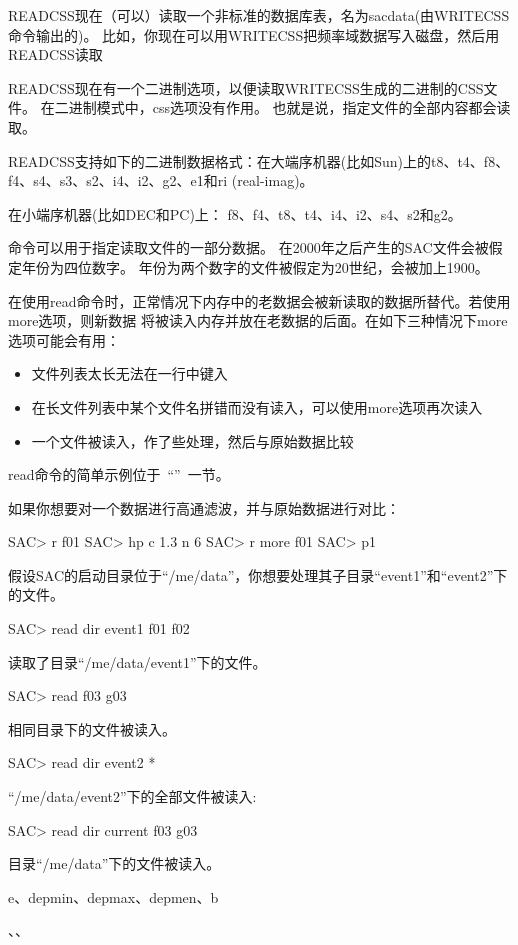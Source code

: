 READCSS现在（可以）读取一个非标准的数据库表，名为sacdata(由WRITECSS命令输出的)。%
比如，你现在可以用WRITECSS把频率域数据写入磁盘，然后用READCSS读取

READCSS现在有一个二进制选项，以便读取WRITECSS生成的二进制的CSS文件。
在二进制模式中，css选项没有作用。
也就是说，指定文件的全部内容都会读取。

READCSS支持如下的二进制数据格式：在大端序机器(比如Sun)上的t8、t4、f8、f4、s4、s3、s2、i4、i2、g2、e1和ri (real-imag)。

在小端序机器(比如DEC和PC)上： f8、f4、t8、t4、i4、i2、s4、s2和g2。

命令可以用于指定读取文件的一部分数据。
在2000年之后产生的SAC文件会被假定年份为四位数字。
年份为两个数字的文件被假定为20世纪，会被加上1900。

在使用read命令时，正常情况下内存中的老数据会被新读取的数据所替代。若使用more选项，则新数据
将被读入内存并放在老数据的后面。在如下三种情况下more选项可能会有用：
\begin{itemize}
\item 文件列表太长无法在一行中键入
\item 在长文件列表中某个文件名拼错而没有读入，可以使用more选项再次读入
\item 一个文件被读入，作了些处理，然后与原始数据比较
\end{itemize}

read命令的简单示例位于~``''~一节。

如果你想要对一个数据进行高通滤波，并与原始数据进行对比：
\begin{SACCode}
SAC> r f01
SAC> hp c 1.3 n 6
SAC> r more f01
SAC> p1
\end{SACCode}

假设SAC的启动目录位于``/me/data''，你想要处理其子目录``event1''和``event2''下的文件。
\begin{SACCode}
SAC> read dir event1 f01 f02
\end{SACCode}
读取了目录``/me/data/event1''下的文件。

\begin{SACCode}
SAC> read f03 g03
\end{SACCode}
相同目录下的文件被读入。

\begin{SACCode}
SAC> read dir event2 *
\end{SACCode}
``/me/data/event2''下的全部文件被读入:

\begin{SACCode}
SAC> read dir current f03 g03
\end{SACCode}
目录``/me/data''下的文件被读入。

e、depmin、depmax、depmen、b

、、
